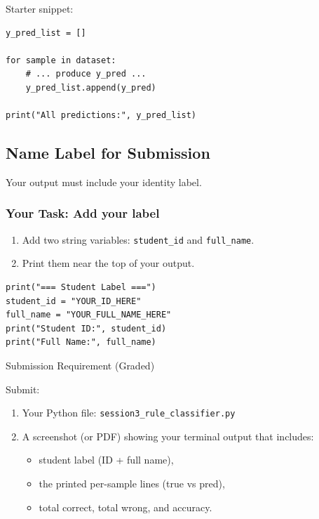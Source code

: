 Starter snippet:
\begin{verbatim}
y_pred_list = []

for sample in dataset:
    # ... produce y_pred ...
    y_pred_list.append(y_pred)

print("All predictions:", y_pred_list)
\end{verbatim}

\newpage
\subsection{Name Label for Submission}

Your output must include your identity label.

\subsubsection{Your Task: Add your label}
\begin{enumerate}
    \item Add two string variables:
    \texttt{student\_id} and \texttt{full\_name}.
    \item Print them near the top of your output.
\end{enumerate}

\begin{verbatim}
print("=== Student Label ===")
student_id = "YOUR_ID_HERE"
full_name = "YOUR_FULL_NAME_HERE"
print("Student ID:", student_id)
print("Full Name:", full_name)
\end{verbatim}

\vspace{2.5cm}
\begin{center}
{\color{red} \Large Submission Requirement (Graded)}
\end{center}

\noindent
Submit:
\begin{enumerate}
    \item Your Python file: \texttt{session3\_rule\_classifier.py}
    \item A screenshot (or PDF) showing your terminal output that includes:
    \begin{itemize}
        \item student label (ID + full name),
        \item the printed per-sample lines (true vs pred),
        \item total correct, total wrong, and accuracy.
    \end{itemize}
\end{enumerate}

